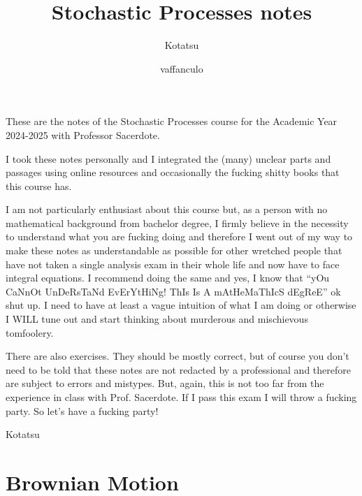 \documentclass[12pt]{report}
\begin{document}
	\title{Stochastic Processes notes}
	\author{Kotatsu}
	\date{\small vaffanculo}
	\maketitle
	\begin{preface}
		These are the notes of the Stochastic Processes course for the Academic Year 2024-2025 with Professor Sacerdote.\par
		I took these notes personally and I integrated the (many) unclear parts and passages using online resources and occasionally the fucking shitty books that this course has. \par
		I am not particularly enthusiast about this course but, as a person with no mathematical background from bachelor degree, I firmly believe in the necessity to understand what you are fucking doing and therefore I went out of my way to make these notes as understandable as possible for other wretched people that have not taken a single analysis exam in their whole life and now have to face integral equations. I recommend doing the same and yes, I know that ``yOu CaNnOt UnDeRsTaNd EvErYtHiNg! ThIs Is A mAtHeMaThIcS dEgReE'' ok shut up. I need to have at least a vague intuition of what I am doing or otherwise I WILL tune out and start thinking about murderous and mischievous tomfoolery.\par
		There are also exercises. They should be mostly correct, but of course you don't need to be told that these notes are not redacted by a professional and therefore are subject to errors and mistypes. But, again, this is not too far from the experience in class with Prof. Sacerdote. If I pass this exam I will throw a fucking party.
		\vskip0.4cm
So let's have a fucking party!
		
		\vskip1.2cm
		
		\hfill Kotatsu
	\end{preface}
	\clearpage
	\tableofcontents
\chapter{Brownian Motion}	
\end{document}
